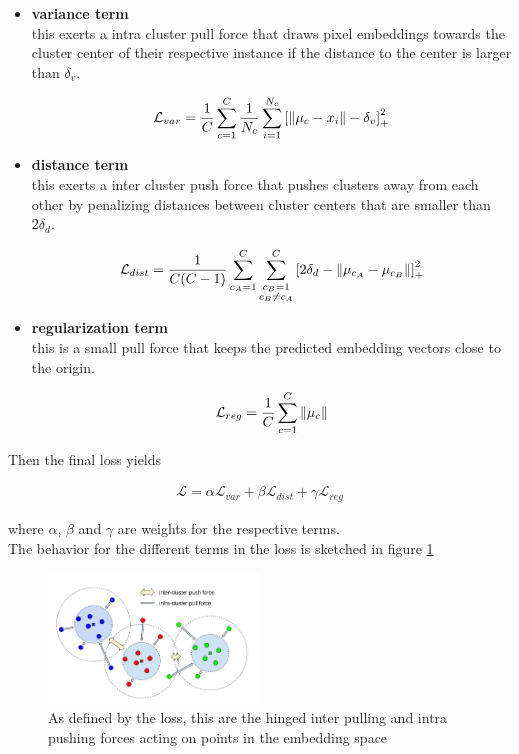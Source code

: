 \begin{itemize}
	\item \textbf{variance term}\\
	this exerts a intra cluster pull force that draws pixel embeddings towards the cluster center of their respective instance if the distance to the center is larger than $\delta_v$.
	
	\begin{align}
		\mathcal{L}_{var} = \frac{1}{C} \sum_{c=1}^C \frac{1}{N_c} \sum_{i=1}^{N_c} \left[ \left\lVert\mu_c - x_i\right\rVert - \delta_v \right]_+^2
	\end{align}
	
	\item \textbf{distance term}\\
	this exerts a inter cluster push force that pushes clusters away from each other by penalizing distances between cluster centers that are smaller than $2\delta_d$.
	
	\begin{align}
		\mathcal{L}_{dist} = \frac{1}{C(C-1)} \sum_{c_A=1}^C \sum_{\substack{c_B=1 \\ c_B \neq c_A}}^C \left[ 2\delta_d - \left\lVert\mu_{c_A} - \mu_{c_B}\right\rVert \right]_+^2
	\end{align}
	
	\item \textbf{regularization term}\\
	this is a small pull force that keeps the predicted embedding vectors close to the origin.
	
	\begin{align}
		\mathcal{L}_{reg} = \frac{1}{C} \sum_{c=1}^C \left\lVert\mu_c\right\rVert
 	\end{align}
\end{itemize}

Then the final loss yields

\begin{align}
	\mathcal{L} = \alpha \mathcal{L}_{var} + \beta \mathcal{L}_{dist} + \gamma \mathcal{L}_{reg}
\end{align}

where $\alpha$, $\beta$ and $\gamma$ are weights for the respective terms.\\

The behavior for the different terms in the loss is sketched in figure \ref{fig_contrastive}

\begin{figure}[ht]
	\centering
	\includegraphics[width=0.5\textwidth]{figures/contrastive_loss.png}
	\caption{\cite{brab2017semantic} As defined by the loss, this are the hinged inter pulling and intra pushing forces acting on points in the embedding space}
	\label{fig_contrastive}
\end{figure}

